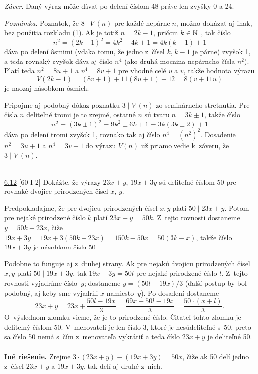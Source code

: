 \textit{Záver}. Daný výraz môže dávať po delení číslom 48 práve len zvyšky 0 a 24.

\textit{Poznámka}. Poznatok, že $8 \mid V~(n)$ pre každé nepárne $n$, možno dokázať aj inak, bez použitia rozkladu (1). Ak je totiž $n = 2k - 1$, pričom $k \in \mathbb{N}$ , tak číslo
$$n^2= (2k - 1)^2= 4k^2 - 4k + 1 = 4k(k - 1) + 1$$
dáva po delení ôsmimi (vďaka tomu, že jedno z~čísel $k$, $k - 1$ je párne) zvyšok 1, a teda rovnaký zvyšok dáva aj číslo $n^4$ (ako druhá mocnina nepárneho čísla $n^2$). Platí teda $n^2 = 8u + 1$ a $n^4 = 8v + 1$ pre vhodné celé $u$ a $v$, takže hodnota výrazu
$$V (2k - 1) = (8v + 1) + 11(8u + 1) - 12 = 8(v + 11u)$$
je naozaj násobkom ôsmich.

Pripojme aj podobný dôkaz poznatku $3 \mid V~(n)$ zo seminárneho stretnutia. Pre čísla $n$ deliteľné tromi je to zrejmé, ostatné $n$ sú tvaru $n = 3k \pm 1$, takže číslo
$$n^2= (3k \pm 1)^2= 9k^2 \pm 6k + 1 = 3k(3k \pm 2) + 1$$
dáva po delení tromi zvyšok 1, rovnako tak aj číslo $n^4 = (n^2)^2$. Dosadenie $n^2 = 3u + 1$ a $n^4 = 3v + 1$ do výrazu $V (n)$ už priamo vedie k~záveru, že $3 \mid V~(n)$.\\
\\
\begin{tcolorbox}[breakable,notitle,boxrule=0pt,colback=light-gray,colframe=light-gray]\ul{6.12} [60-I-2]
Dokážte, že výrazy $23x + y$, $19x + 3y$ sú deliteľné číslom 50 pre rovnaké dvojice prirodzených čísel $x$, $y$.

\end{tcolorbox}

\rieh Predpokladajme, že pre dvojicu prirodzených čísel $x, y$ platí $50 \mid 23x + y$. Potom pre nejaké prirodzené číslo $k$ platí $23x + y = 50k$. Z~tejto rovnosti dostaneme $y = 50k - 23x$, čiže $19x + 3y = 19x + 3(50k - 23x) = 150k - 50x = 50(3k - x)$, takže číslo $19x + 3y$ je násobkom čísla 50.

Podobne to funguje aj z~druhej strany. Ak pre nejakú dvojicu prirodzených čísel $x,y$ platí $50 \mid 19x + 3y$, tak $19x + 3y = 50l$ pre nejaké prirodzené číslo $l$. Z~tejto rovnosti vyjadríme číslo~$y$; dostaneme $y = (50l - 19x)/3$ (ďalší postup by bol podobný, aj keby sme vyjadrili $x$ namiesto~$y$). Po dosadení dostaneme $$23x + y = 23x + \frac{50l - 19x}{3}=\frac{69x + 50l - 19x}{3}=\frac{50 \cdot (x + l)}{3}.$$
O~výslednom zlomku vieme, že je to prirodzené číslo. Čitateľ tohto zlomku je deliteľný číslom 50. V~menovateli je len číslo 3, ktoré je nesúdeliteľné s~50, preto sa číslo 50 nemá s~čím z~menovateľa vykrátiť a teda číslo $23x + y$ je deliteľné 50.\\
\\
\textbf{Iné riešenie.} Zrejme $3 \cdot (23x + y) - (19x + 3y) = 50x$, čiže ak 50 delí jedno z~čísel $23x + y$ a $19x + 3y$, tak delí aj druhé z~nich.\\
